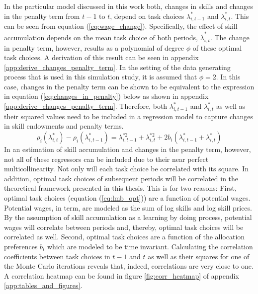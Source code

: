 \documentclass[../main.tex]{subfiles}
\begin{document}
In the particular model discussed in this work both, changes in skills and changes in the penalty term from $t-1$ to $t$, depend on task choices $\lambda_{i,t-1}^*$ and $\lambda_{i,t}^*$. This can be seen from equation (\ref{eq:wage_change}). Specifically, the effect of skill accumulation depends on the mean task choice of both periods, $\bar{\lambda}_{i,t}^*$. The change in penalty term, however, results as a polynomial of degree $\phi$ of these optimal task choices. A derivation of this result can be seen in appendix \ref{app:derive_changes_penalty_term}. In the setting of the data generating process that is used in this simulation study, it is assumed that $\phi = 2$. In this case, changes in the penalty term can be shown to be equivalent to the expression in equation (\ref{eq:changes_in_penalty}) below as shown in appendix \ref{app:derive_changes_penalty_term}. Therefore, both $\lambda_{i,t-1}^*$ and $\lambda_{i,t}^*$ as well as their squared values need to be included in a regression model to capture changes in skill endowments and penalty terms.
\begin{equation}\label{eq:changes_in_penalty}
	\rho_{i}(\lambda_{i,t}^*) - \rho_{i}(\lambda_{i,t-1}^*) = \lambda_{i,t-1}^{*2} + \lambda_{i,t}^{*2} + 2b_i(\lambda_{i,t-1}^* + \lambda_{i,t}^*) 
\end{equation}
In an estimation of skill accumulation and changes in the penalty term, however, not all of these regressors can be included due to their near perfect multicollinearity. Not only will each task choice be correlated with its square. In addition, optimal task choices of subsequent periods will be correlated in the theoretical framework presented in this thesis. This is for two reasons: First, optimal task choices (equation (\ref{eq:lmb_opt})) are a function of potential wages. Potential wages, in term, are modeled as the sum of log skills and log skill prices. By the assumption of skill accumulation as a learning by doing process, potential wages will correlate between periods and, thereby, optimal task choices will be correlated as well. Second, optimal task choices are a function of the allocation preferences $b_i$ which are modeled to be time invariant. Calculating the correlation coefficients between task choices in $t-1$ and $t$ as well as their squares for one of the Monte Carlo iterations reveals that, indeed, correlations are very close to one. A correlation heatmap can be found in figure \ref{fig:corr_heatmap} of appendix \ref{app:tables_and_figures}.
\end{document}
